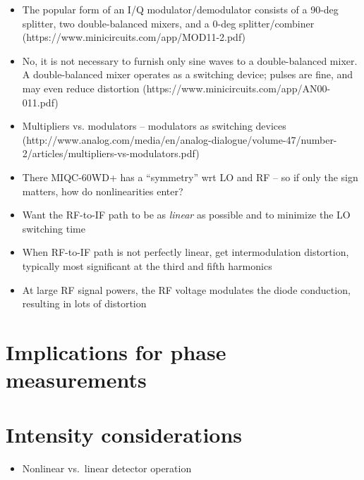 \begin{itemize}
  \item The popular form of an I/Q modulator/demodulator consists of
    a 90-deg splitter,
    two double-balanced mixers, and
    a 0-deg splitter/combiner
    (https://www.minicircuits.com/app/MOD11-2.pdf)
  \item No, it is not necessary to furnish only sine waves
    to a double-balanced mixer.
    A double-balanced mixer operates as a switching device;
    pulses are fine, and may even reduce distortion
    (https://www.minicircuits.com/app/AN00-011.pdf)
  \item Multipliers vs. modulators -- modulators as switching devices
    (http://www.analog.com/media/en/analog-dialogue/volume-47/number-2/articles/multipliers-vs-modulators.pdf)
  \item There MIQC-60WD+ has a ``symmetry'' wrt LO and RF --
    so if only the sign matters, how do nonlinearities enter?
  \item Want the RF-to-IF path to be as \emph{linear} as possible
    and to minimize the LO switching time
  \item When RF-to-IF path is not perfectly linear,
    get intermodulation distortion, typically most significant
    at the third and fifth harmonics
  \item At large RF signal powers, the RF voltage modulates
    the diode conduction, resulting in lots of distortion
\end{itemize}


\section{Implications for phase measurements}


\section{Intensity considerations}
\begin{itemize}
  \item Nonlinear vs.\ linear detector operation
\end{itemize}





